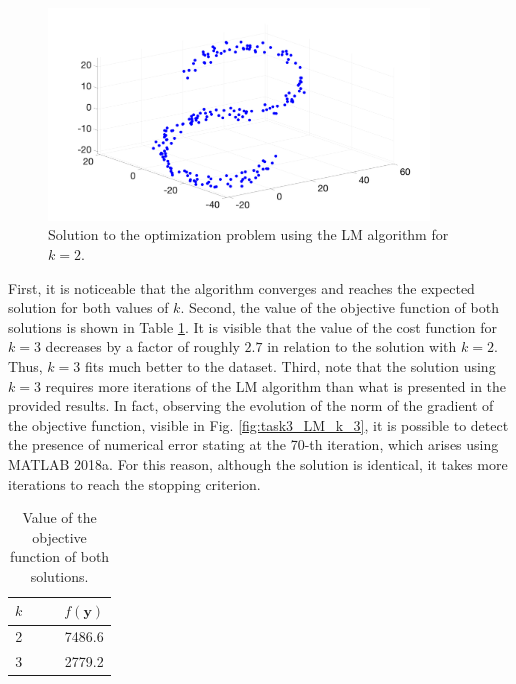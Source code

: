 \documentclass[12pt]{article}
\begin{document}
\begin{figure}[ht!]
	\centering
	\includegraphics[width=0.9\textwidth]{figures/task3_lowerDim_k_3.png}
	\caption{Solution to the optimization problem using the LM algorithm for $k=2$.}
	\label{fig:task3_lowerDim_k_3}
\end{figure}

First, it is noticeable that the algorithm converges and reaches the expected solution for both values of $k$. Second, the value of the objective function of both solutions is shown in Table \ref{tb:costFunction}. It is visible that the value of the cost function for $k=3$ decreases by a factor of roughly $2.7$ in relation to the solution with $k=2$. Thus, $k=3$ fits much better to the dataset. Third, note that the solution using $k=3$ requires more iterations of the LM algorithm than what is presented in the provided results. In fact, observing the evolution of the norm of the gradient of the objective function, visible in Fig. \ref{fig:task3_LM_k_3}, it is possible to detect the presence of numerical error stating at the 70-th iteration, which arises using MATLAB 2018a. For this reason, although the solution is identical, it takes more iterations to reach the stopping criterion. 

\begin{table}[ht!]
	\centering
	\caption{Value of the objective function of both solutions.}
	\label{tb:costFunction}
	\begin{tabular}{c c c}
		\hline
		$k$&$\quad$ & $f(\mathbf{y})$\\ \hline
		2 &$\quad$ & 7486.6\\
		3 &$\quad$ & 2779.2\\
		\hline
	\end{tabular}
\end{table} 
\end{document}
